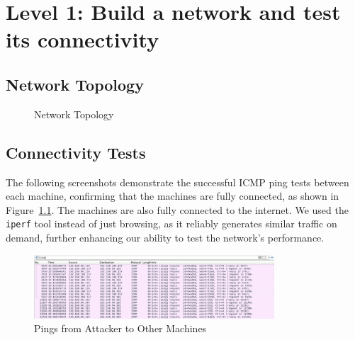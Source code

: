 \chapter{Level 1: Build a network and test its connectivity}

\section{Network Topology}

\begin{figure}[H]
    \centering
    \caption{Network Topology}\label{fig:NetworkTopology}
\end{figure}

\section{Connectivity Tests}

The following screenshots demonstrate the successful ICMP ping tests between each machine, confirming that the machines are fully connected, as shown in Figure~\ref{fig:NetworkTopology}. The machines are also fully connected to the internet. We used the \texttt{iperf} tool instead of just browsing, as it reliably generates similar traffic on demand, further enhancing our ability to test the network's performance.

\begin{figure}[H]
    \centering
    \includegraphics[width=0.8\textwidth]{img/level1/level1-192-168-96-110.png}
    \caption{Pings from Attacker to Other Machines}\label{fig:PingAttacker}
\end{figure}

